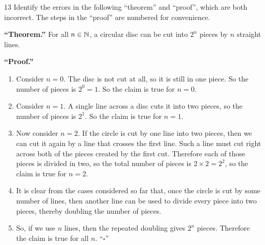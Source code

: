 \documentclass[11pt]{article}
\begin{document}
\begin{exercise}{13}
    Identify the errors in the following ``theorem'' and ``proof'',
    which are both incorrect. The steps in the ``proof'' are numbered
    for convenience.

    \medskip
    \textbf{``Theorem.''} For all $n \in \mathbb{N}$, a circular disc can be
    cut into $2^n$ pieces by $n$ straight lines.

    \textbf{``Proof.''}
    \begin{enumerate}
        \item Consider $n=0$. The disc is not cut at all, so it is
            still in one piece. So the number of pieces is $2^0=1$.
            So the claim is true for $n=0$.
        \item Consider $n=1$. A single line across a disc cuts it
            into two pieces, so the number of pieces is $2^1$. So the
            claim is true for $n=1$.
        \item Now consider $n=2$. If the circle is cut by one line
            into two pieces, then we can cut it again by a line that
            crosses the first line. Such a line must cut right across
            both of the pieces created by the first cut. Therefore
            each of those pieces is divided in two, so the total
            number of pieces is $2\times 2 = 2^2$, so the claim is
            true for $n=2$.
        \item It is clear from the cases considered so far that, once
            the circle is cut by some number of lines, then another
            line can be used to divide every piece into two pieces,
            thereby doubling the number of pieces.
        \item So, if we use $n$ lines, then the repeated doubling
            gives $2^n$ pieces. Therefore the claim is true for all
            $n$. \hfill ``$\square$''
    \end{enumerate}
\end{exercise}
\begin{solution}

\end{solution}
\end{document}

